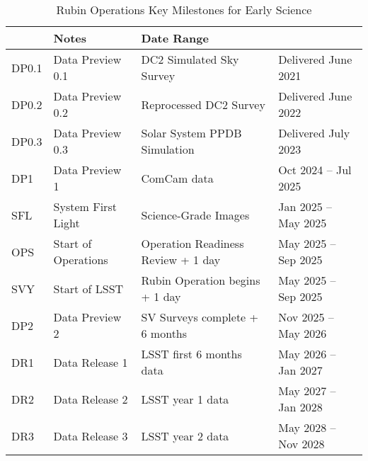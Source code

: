 \begin{table}[ht]
\centering
\fontsize{10}{12}\selectfont 
{} %
\setlength{\tabcolsep}{9pt} %
\renewcommand{\arraystretch}{1.6} %
\begin{tabular}[!hb]{l|l|l|l} \hline
\rowcolor{RubinTeal2} 
 \multicolumn{2}{|l|}{\textbf{Event}} &  \textbf{Notes}             &   \textbf{Date Range}  \\\hline\hline
DP0.1  & Data Preview 0.1   &  DC2 Simulated Sky Survey                &  Delivered June 2021                  \\
DP0.2 & Data Preview 0.2     &  Reprocessed DC2 Survey                 & Delivered June 2022                  \\
DP0.3 &  Data Preview 0.3     &   Solar System PPDB Simulation       & Delivered July 2023                  \\
DP1   &  Data Preview 1        &   ComCam data                                   & Oct 2024 -- Jul 2025  \\
SFL    & System First Light    &   Science-Grade Images                      & Jan 2025 -- May 2025  \\
OPS   & Start of Operations  & Operation Readiness Review  + 1 day & May 2025 -- Sep 2025 \\ 
SVY   & Start of LSST           & Rubin Operation begins + 1 day  & May 2025 -- Sep 2025 \\
DP2   & Data Preview 2        & SV Surveys complete  + 6 months  &  Nov 2025 -- May 2026 \\
DR1   & Data Release 1        & LSST  first 6 months data & May 2026 -- Jan 2027 \\
DR2   & Data Release 2        & LSST  year 1 data & May 2027 -- Jan 2028 \\
DR3   & Data Release 3        & LSST  year 2 data &  May 2028 -- Nov 2028 \\\hline\hline
\end{tabular}
\caption{Rubin Operations Key Milestones for Early Science}
\label{tab:milestones}
\end{table}
